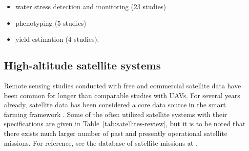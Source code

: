 \begin{itemize}
    \item water stress detection and monitoring (23 studies)
    \item phenotyping (5 studies)
    \item yield estimation (4 studies).
\end{itemize}


\subsection{High-altitude satellite systems}
\label{subsec:data-satellites-review}

Remote sensing studies conducted with free and commercial satellite data have been common for longer than comparable studies with UAVs. For several years already, satellite data has been considered a core data source in the smart farming framework \cite{Wolfert2017d}. Some of the often utilized satellite systems with their specifications are given in Table~\ref{tab:satellites-review}, but it is to be noted that there exists much larger number of past and presently operational satellite missions. For reference, see the database of satellite missions at \cite{SatelliteMissionsDirectory}.

